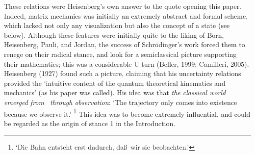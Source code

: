 \documentclass[12pt]{article}
\begin{document}
These relations were Heisenberg's own answer to the quote opening this paper.  Indeed, matrix mechanics was initially an extremely abstract and formal scheme, which lacked not only any visualization but also the concept of a state (see below). Although these features were initially quite to the liking of Born, Heisenberg, Pauli, and Jordan, the success of Schr\"{o}dinger's work forced them to renege on their radical stance, and look for a semiclassical picture supporting their mathematics; this was a considerable U-turn  (Beller, 1999; Camilleri, 2005).  Heisenberg (1927) found such a picture, claiming that his uncertainty relations provided the `intuitive content of the quantum theoretical kinematics and mechanics' (as his paper was called). His idea was that {\it the classical world emerged from \qm\ through observation}: `The trajectory only comes into existence because we observe it.' \footnote{`Die Bahn entsteht erst dadurch, da\ss\ wir sie beobachten.'}  This idea was to become extremely influential, and could be regarded as the origin of stance 1 in the Introduction. 
\end{document}
